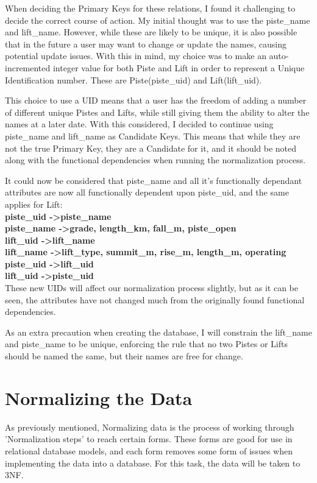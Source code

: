 \documentclass[11pt]{scrartcl} %
\begin{document}
When deciding the Primary Keys for these relations, I found it challenging to decide the correct course of action. My initial thought was to use the piste\_name and lift\_name. However, while these are likely to be unique, it is also possible that in the future a user may want to change or update the names, causing potential update issues. With this in mind, my choice was to make an auto-incremented integer value for both Piste and Lift in order to represent a Unique Identification number. These are Piste(piste\_uid) and Lift(lift\_uid).

This choice to use a UID means that a user has the freedom of adding a number of different unique Pistes and Lifts, while still giving them the ability to alter the names at a later date. With this considered, I decided to continue using piste\_name and lift\_name as Candidate Keys. This means that while they are not the true Primary Key, they are a Candidate for it, and it should be noted along with the functional dependencies when running the normalization process.

It could now be considered that piste\_name and all it's functionally dependant attributes are now all functionally dependent upon piste\_uid, and the same applies for Lift:\\[0.3cm]
\textbf{piste\_uid -\textgreater \space piste\_name}\\
\textbf{piste\_name -\textgreater \space grade, length\_km, fall\_m, piste\_open}\\[0.3cm]
\textbf{lift\_uid -\textgreater \space lift\_name}\\
\textbf{lift\_name -\textgreater \space lift\_type, summit\_m, rise\_m, length\_m, operating}\\[0.3cm]
\textbf{piste\_uid -\textgreater \space lift\_uid}\\
\textbf{lift\_uid -\textgreater \space piste\_uid}
\\[0.3cm]
These new UIDs will affect our normalization process slightly, but as it can be seen, the attributes have not changed much from the originally found functional dependencies.

As an extra precaution when creating the database, I will constrain the lift\_name and piste\_name to be unique, enforcing the rule that no two Pistes or Lifts should be named the same, but their names are free for change.

\newpage

\section{Normalizing the Data}
As previously mentioned, Normalizing data is the process of working through 'Normalization steps' to reach certain forms. These forms are good for use in relational database models, and each form removes some form of issues when implementing the data into a database. For this task, the data will be taken to 3NF.
\end{document}

